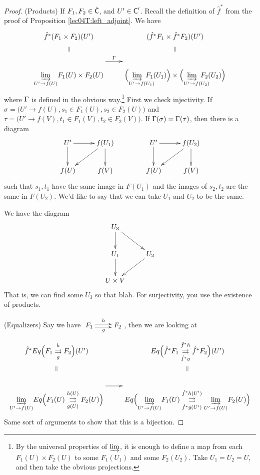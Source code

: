 \begin{proof}
   (Products) If $F_1,F_2\in \hat {\text{\sf C}}$, and $U'\in \text{\sf C}'$. Recall the definition of $\hat
   f^*$ from the proof of Proposition \ref{lec04T:left_adjoint}. We have
    \[\xymatrix@R-1.5pc{
     \hat f^*(F_1\times F_2)(U') \ar@{}[d]|{\parallel} & (\hat f^* F_1\times \hat f^*
     F_2)(U') \ar@{}[d]|{\parallel}\\
     \raisebox{-2em}{$\underset{U'\to f(U)}{\varinjlim}F_1(U)\times F_2(U)$} \ar[r]^<>(.5)\Ga &
     \raisebox{-2em}{$\Bigl(\underset{U'\to f(U_1)\hspace{-3ex}}{\varinjlim}F_1(U_1)\Bigr)\times \Bigl(
     \underset{U'\to f(U_2)\hspace{-3ex}}{\varinjlim}F_2(U_2)\Bigr)$} }\] where $\Gamma$ is
   defined in the obvious way.\footnote{By the universal properties of $\varinjlim$, it
   is enough to define a map from each $F_1(U)\times F_2(U)$ to some $F_1(U_1)$ and some
   $F_2(U_2)$. Take $U_1=U_2=U$, and then take the obvious projections.} First we check
   injectivity. If $\sigma=\bigl(U'\to f(U),s_1\in F_1(U),s_2\in F_2(U)\bigr)$ and $\tau
   = \bigl(U'\to f(V),t_1\in F_1(V),t_2\in F_2(V)\bigr)$. If $\Gamma(\sigma)=\Gamma(\tau)$,
   then there is a diagram
   \[\xymatrix{
    U' \ar[r]\ar[d] & f(U_1) \ar[d] \ar[dl]\\
    f(U) & f(V) }\qquad\qquad
    \xymatrix{
    U' \ar[r]\ar[d] & f(U_2) \ar[d] \ar[dl]\\
    f(U) & f(V) }
   \]
   such that $s_1,t_1$ have the same image in $F(U_1)$ and the images of $s_2,t_2$ are
   the same in $F(U_2)$. We'd like to say that we can
   take $U_1$ and $U_2$ to be the same.

   We have the diagram
   \[\xymatrix{
    U_3 \ar[d]\ar[dr]\\
    U_1\ar[d] & U_2 \ar[dl]\\
    U\times V
   }\]
   That is, we can find some $U_3$ so that blah\anton{}. For surjectivity, you use the
   existence of products.

   (Equalizers) Say we have
   $\xymatrix{F_1\ar@<.5ex>[r]^h \ar@<-.5ex>[r]_g & F_2}$, then we are looking at
   \[\xymatrix @R-1pc{
    \hat f^* Eq\Bigl(F_1 \underset{g}{\overset{h}{\rightrightarrows}} F_2\Bigr)(U')
    \ar@{}[d]|{\parallel}
    &
    Eq\Bigl(
    \hat f^* F_1 \underset{\hat f^*g}{\overset{\hat f^*h}{\rightrightarrows}} \hat f^* F_2
    \Bigr)(U')
    \ar@{}[d]|{\parallel}
   \\
    \raisebox{-2em}{$\underset{U'\to f(U)}{\varinjlim} Eq\Bigl( F_1(U)
   \underset{g(U)}{\overset{h(U)}{\rightrightarrows}} F_2(U)\Bigr)$} \ar[r]
   &
    \raisebox{-2em}{$ Eq\Bigl( \underset{U'\to f(U)}{\varinjlim}F_1(U)
   \underset{\hat f^*g(U')}{\overset{\hat f^*h(U')}{\rightrightarrows}} \underset{U'\to
   f(U)}{\varinjlim}F_2(U)\Bigr)$}
   }\]
    Same sort of arguments to show that this is a bijection.
 \end{proof}
